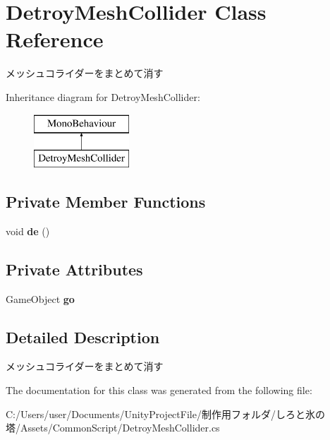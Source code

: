 \hypertarget{class_detroy_mesh_collider}{}\section{Detroy\+Mesh\+Collider Class Reference}
\label{class_detroy_mesh_collider}


メッシュコライダーをまとめて消す  


Inheritance diagram for Detroy\+Mesh\+Collider\+:\begin{figure}[H]
\begin{center}
\leavevmode
\includegraphics[height=2.000000cm]{class_detroy_mesh_collider}
\end{center}
\end{figure}
\subsection*{Private Member Functions}
\begin{DoxyCompactItemize}
\item 
\mbox{\label{class_detroy_mesh_collider_a89c8e684a2d661adfb2bcb55ee8af210}} 
void {\bfseries de} ()
\end{DoxyCompactItemize}
\subsection*{Private Attributes}
\begin{DoxyCompactItemize}
\item 
\mbox{\label{class_detroy_mesh_collider_a3fb4275c85d822f35dea5a539490678a}} 
Game\+Object {\bfseries go}
\end{DoxyCompactItemize}


\subsection{Detailed Description}
メッシュコライダーをまとめて消す 



The documentation for this class was generated from the following file\+:\begin{DoxyCompactItemize}
\item 
C\+:/\+Users/user/\+Documents/\+Unity\+Project\+File/制作用フォルダ/しろと氷の塔/\+Assets/\+Common\+Script/Detroy\+Mesh\+Collider.\+cs\end{DoxyCompactItemize}

